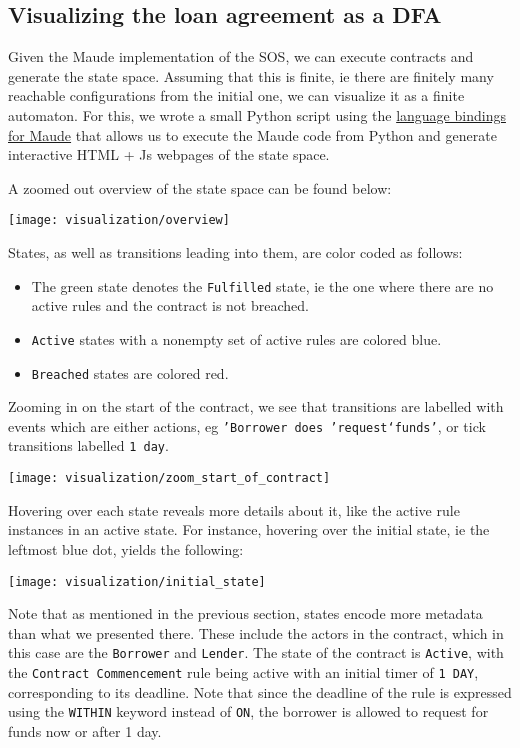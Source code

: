 \documentclass{article}
\begin{document}
\subsection{Visualizing the loan agreement as a DFA}

Given the Maude implementation of the SOS, we can execute contracts and
generate the state space.
Assuming that this is finite, ie there are finitely many reachable configurations
from the initial one, we can visualize it as a finite automaton.
For this, we wrote a small Python script using the
\href{https://github.com/fadoss/maude-bindings}{language bindings for Maude}
that allows us to execute the Maude code from Python and generate interactive
HTML + Js webpages of the state space.

A zoomed out overview of the state space can be found below:

\texttt{[image: visualization/overview]}

States, as well as transitions leading into them, are color coded as follows:

\begin{itemize}
  \item
  The green state denotes the \texttt{Fulfilled} state, ie the one where
  there are no active rules and the contract is not breached.

  \item
  \texttt{Active} states with a nonempty set of active rules are colored blue.

  \item
  \texttt{Breached} states are colored red.
\end{itemize}

Zooming in on the start of the contract, we see that transitions are labelled
with events which are either actions,
eg \texttt{'Borrower does 'request`funds'},
or tick transitions labelled \texttt{1 day}.

\texttt{[image: visualization/zoom\_start\_of\_contract]}

Hovering over each state reveals more details about it, like the active rule
instances in an active state.
For instance, hovering over the initial state, ie the leftmost blue dot,
yields the following:

\texttt{[image: visualization/initial\_state]}

Note that as mentioned in the previous section, states encode more metadata
than what we presented there.
These include the actors in the contract, which in this case are the
\texttt{Borrower} and \texttt{Lender}.
The state of the contract is \texttt{Active}, with the
\texttt{Contract Commencement} rule being active with an initial timer of
\texttt{1 DAY}, corresponding to its deadline.
Note that since the deadline of the rule is expressed using the \texttt{WITHIN}
keyword instead of \texttt{ON}, the borrower is allowed to request for
funds now or after 1 day.
\end{document}
